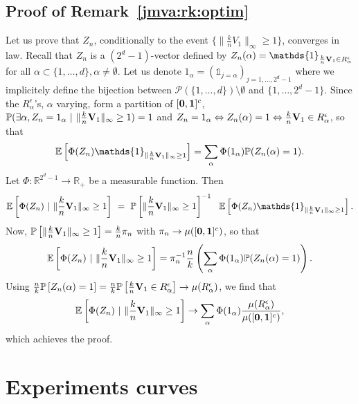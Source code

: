 \subsection{Proof of Remark~\ref{jmva:rk:optim}}
Let us prove that $Z_n$, conditionally to the event $\{\|\frac{k}{n} V_1\|_\infty \ge 1\}$, converges in law.
Recall that $Z_n$ is a $(2^d-1)$-vector defined by $Z_n(\alpha)=\mathds{1}_{\frac{k}{n} \mb V_1 \in R_\alpha^\epsilon}$ for all $\alpha \subset \{1,\ldots,d\}, \alpha \neq \emptyset$.
Let us denote $1_\alpha = (\mathds{1}_{j=\alpha})_{j=1,\ldots, 2^d-1}$ where we implicitely define the bijection between $\mathcal{P}(\{1,\ldots,d\}) \setminus \emptyset$ and $\{1,\ldots,2^d-1\}$.
Since the $R_\alpha^\epsilon$'s, $\alpha$ varying, form a partition of $[\mathbf 0, \mathbf 1]^c$,
$\mathbb{P}(\exists \alpha, Z_n = 1_\alpha ~|~\|\frac{k}{n} \mathbf V_1 \|_\infty \ge 1)=1$ and 
$Z_n = 1_\alpha \Leftrightarrow Z_n(\alpha) = 1 \Leftrightarrow \frac{k}{n} \mathbf V_1 \in R_\alpha^\epsilon$, so that
%
$$\mathbb{E}\left[\Phi(Z_n) \mathds{1}_{\|\frac{k}{n} \mb V_1 \|_\infty \ge 1}\right] = \sum_\alpha \Phi(1_\alpha) \mathbb{P}(Z_n(\alpha) = 1).$$
%
\noindent
Let $\Phi: \mathbb{R}^{2^d-1} \to \mathbb{R}_+$ be a measurable function. Then
\begin{align*}
\mathbb{E}\left[\Phi(Z_n) ~|~ \|\frac{k}{n} \mb V_1 \|_\infty \ge 1\right] ~=~ \mathbb{P}\left[\|\frac{k}{n} \mb V_1 \|_\infty \ge 1\right]^{-1}~~ \mathbb{E}\left[\Phi(Z_n) \mathds{1}_{\|\frac{k}{n} \mb V_1 \|_\infty \ge 1}\right].
\end{align*}
Now, $\mathbb{P}\left[\|\frac{k}{n} \mathbf V_1 \|_\infty \ge 1\right] = \frac{k}{n} \pi_n$ with $\pi_n \to \mu([\mathbf 0, \mathbf 1]^c)$, so that
$$\mathbb{E}\left[\Phi(Z_n) ~|~ \|\frac{k}{n} \mathbf V_1 \|_\infty \ge 1\right] = \pi_n^{-1} \frac{n}{k}\left(\sum_\alpha \Phi(1_\alpha) \mathbb{P}(Z_n(\alpha) = 1) \right).$$
Using $\frac{n}{k} \mathbb{P}\left[Z_n(\alpha)=1\right] = \frac{n}{k}\mathbb{P}\left[\frac{k}{n} \mathbf V_1 \in R_\alpha^\epsilon\right] \to \mu(R_\alpha^\epsilon)$, we find that
%
$$\mathbb{E}\left[\Phi(Z_n) ~|~ \|\frac{k}{n} \mathbf V_1 \|_\infty \ge 1\right] \to \sum_\alpha \Phi(1_\alpha) \frac{\mu(R_\alpha^\epsilon)}{\mu([\mathbf 0, \mathbf 1]^c)},$$
which achieves the proof.

\section{Experiments curves}
\label{jmva:appendix_exp}

